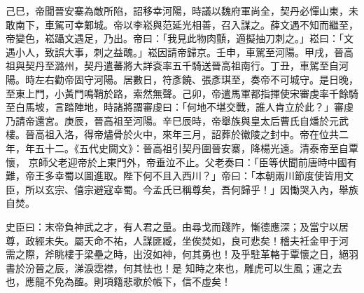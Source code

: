 \begin{pinyinscope}
 己巳，帝聞晉安寨為敵所陷，詔移幸河陽，時議以魏府軍尚全，契丹必憚山東，未敢南下，車駕可幸鄴城。帝以李崧與范延光相善，召入謀之。薛文遇不知而繼至，帝變色，崧躡文遇足，乃出。帝曰：「我見此物肉顫，適擬抽刀刺之。」崧曰：「文遇小人，致誤大事，刺之益醜。」崧因請帝歸京。壬申，車駕至河陽。甲戌，晉高祖與契丹至潞州，契丹遣蕃將大詳袞率五千騎送晉高祖南行。丁丑，車駕至自河
 陽。時左右勸帝固守河陽。居數日，符彥饒、張彥琪至，奏帝不可城守。是日晚，至東上門，小黃門鳴鞘於路，索然無聲。己卯，帝遣馬軍都指揮使宋審虔率千餘騎至白馬坡，言踏陣地，時諸將謂審虔曰：「何地不堪交戰，誰人肯立於此？」審虔乃請帝還宮。庚辰，晉高祖至河陽。辛巳辰時，帝舉族與皇太后曹氏自燔於元武樓。晉高祖入洛，得帝燼骨於火中，來年三月，詔葬於徽陵之封中。帝在位共二年，年五十二。《五代史闕文》：晉高祖引契丹圍晉安寨，降楊光遠。清泰帝至自覃懷，
 京師父老迎帝於上東門外，帝垂泣不止。父老奏曰：「臣等伏聞前唐時中國有難，帝王多幸蜀以圖進取。陛下何不且入西川？」帝曰：「本朝兩川節度使皆用文臣，所以玄宗、僖宗避寇幸蜀。今孟氏已稱尊矣，吾何歸乎！」因慟哭入內，舉族自焚。



 史臣曰：末帝負神武之才，有人君之量。由尋戈而踐阼，慚德應深；及當宁以居尊，政經未失。屬天命不祐，人謀匪臧，坐俟焚如，良可悲矣！稽夫衽金甲于河需之際，斧眺樓于梁壘之時，出沒如神，何其勇也！及乎駐革輅于覃懷之日，絕羽書於汾晉之辰，涕淚霑襟，何其怯也！是
 知時之來也，雕虎可以生風；運之去也，應龍不免為醢。則項籍悲歌於帳下，信不虛矣！



\end{pinyinscope}